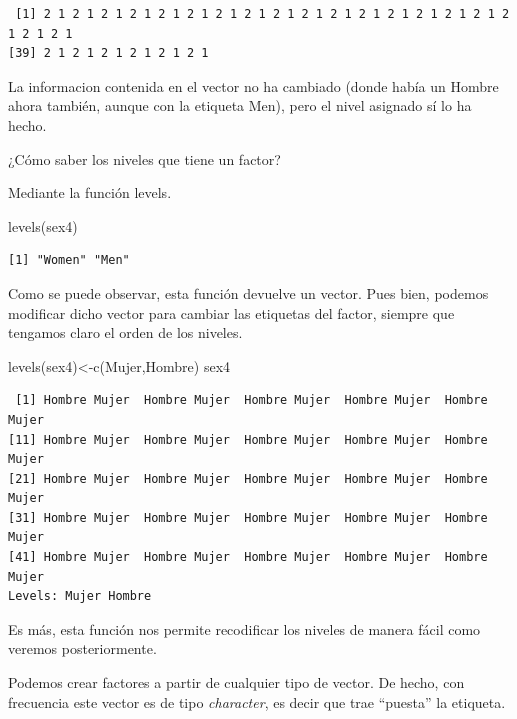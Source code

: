 \documentclass[
  letterpaper,
  DIV=11,
  numbers=noendperiod]{scrreprt}
\newenvironment{Shaded}{\begin{snugshade}}{\end{snugshade}}
\newcommand{\FunctionTok}[1]{\textcolor[rgb]{0.28,0.35,0.67}{#1}}
\newcommand{\NormalTok}[1]{\textcolor[rgb]{0.00,0.23,0.31}{#1}}
\newcommand{\OtherTok}[1]{\textcolor[rgb]{0.00,0.23,0.31}{#1}}
\newcommand{\StringTok}[1]{\textcolor[rgb]{0.13,0.47,0.30}{#1}}
\begin{document}
\begin{verbatim}
 [1] 2 1 2 1 2 1 2 1 2 1 2 1 2 1 2 1 2 1 2 1 2 1 2 1 2 1 2 1 2 1 2 1 2 1 2 1 2 1
[39] 2 1 2 1 2 1 2 1 2 1 2 1
\end{verbatim}

La informacion contenida en el vector no ha cambiado (donde había un
Hombre ahora también, aunque con la etiqueta Men), pero el nivel
asignado sí lo ha hecho.

¿Cómo saber los niveles que tiene un factor?

Mediante la función levels.

\begin{Shaded}
\begin{Highlighting}[]
\FunctionTok{levels}\NormalTok{(sex4)}
\end{Highlighting}
\end{Shaded}

\begin{verbatim}
[1] "Women" "Men"  
\end{verbatim}

Como se puede observar, esta función devuelve un vector. Pues bien,
podemos modificar dicho vector para cambiar las etiquetas del factor,
siempre que tengamos claro el orden de los niveles.

\begin{Shaded}
\begin{Highlighting}[]
\FunctionTok{levels}\NormalTok{(sex4)}\OtherTok{\textless{}{-}}\FunctionTok{c}\NormalTok{(}\StringTok{\textquotesingle{}Mujer\textquotesingle{}}\NormalTok{,}\StringTok{\textquotesingle{}Hombre\textquotesingle{}}\NormalTok{)}
\NormalTok{sex4}
\end{Highlighting}
\end{Shaded}

\begin{verbatim}
 [1] Hombre Mujer  Hombre Mujer  Hombre Mujer  Hombre Mujer  Hombre Mujer 
[11] Hombre Mujer  Hombre Mujer  Hombre Mujer  Hombre Mujer  Hombre Mujer 
[21] Hombre Mujer  Hombre Mujer  Hombre Mujer  Hombre Mujer  Hombre Mujer 
[31] Hombre Mujer  Hombre Mujer  Hombre Mujer  Hombre Mujer  Hombre Mujer 
[41] Hombre Mujer  Hombre Mujer  Hombre Mujer  Hombre Mujer  Hombre Mujer 
Levels: Mujer Hombre
\end{verbatim}

Es más, esta función nos permite recodificar los niveles de manera fácil
como veremos posteriormente.

Podemos crear factores a partir de cualquier tipo de vector. De hecho,
con frecuencia este vector es de tipo \emph{character}, es decir que
trae ``puesta'' la etiqueta.
\end{document}
